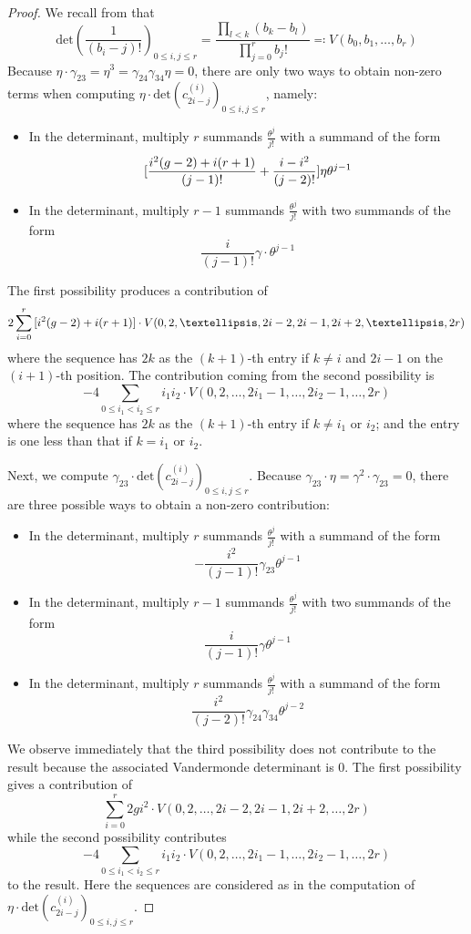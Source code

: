\documentclass{article}
\theoremstyle{plain}
\theoremstyle{definition}
\begin{document}
\begin{proof}
We recall from \cite{FarkasCastel} that  \[\mathrm{det}(\frac{1}{(b_i-j)!})_{0\leq i, j\leq r} = \frac{\prod_{l<k}(b_k-b_l)}{\prod_{j=0}^{r}b_j!}\eqqcolon V(b_0,b_1,\ldots, b_r)\]
Because $\eta\cdot \gamma_{23} = \eta^3 = \gamma_{24}\gamma_{34}\eta = 0$, there are only two ways to obtain non-zero terms when computing $\eta \cdot \mathrm{det}(c^{(i)}_{2i-j})_{0\leq i,j\leq r}$, namely: 
\begin{itemize}
	\item In the determinant, multiply $r$ summands $\frac{\theta^j}{j!}$ with a summand of the form 
	\[ \text{\LARGE [} \frac{i^2(g-2) + i(r+1)}{(j-1)!} + \frac{i-i^2}{(j-2)!} \text{\LARGE ]}\eta\theta^{j-1} \]
	\item  In the determinant, multiply $r-1$ summands $\frac{\theta^j}{j!}$ with two summands of the form 
	\[ \frac{i}{(j-1)!}\gamma\cdot \theta^{j-1} \] 
\end{itemize}  
The first possibility produces a contribution of 
\[ 2\sum_{i=0}^r\text{\Large [}i^2(g-2) +i(r+1) \text{\Large ]}\cdot V(0,2,\ldots, 2i-2, 2i-1, 2i+2,\ldots, 2r) \]
where the sequence has $2k$ as the $(k+1)$-th entry if $k\neq i$ and $2i-1$ on the $(i+1)$-th position. The contribution coming from the second possibility is 
\[ - 4\sum_{0\leq i_1<i_2\leq r}i_1i_2\cdot V(0,2,\ldots, 2i_1-1, \ldots, 2i_2-1,\ldots, 2r)\]
where the sequence has $2k$ as the $(k+1)$-th entry if $k\neq i_1$ or $i_2$; and the entry is one less than that if $k =i_1$ or $i_2$.

Next, we compute $\gamma_{23}\cdot \mathrm{det}(c^{(i)}_{2i-j})_{0\leq i,j\leq r}$. Because $\gamma_{23}\cdot \eta = \gamma^2\cdot \gamma_{23} = 0$, there are three possible ways to obtain a non-zero contribution: 
\begin{itemize}
	\item In the determinant, multiply $r$ summands $\frac{\theta^j}{j!}$ with a summand of the form  
	\[  - \frac{i^2}{(j-1)!}\gamma_{23}\theta^{j-1}\]
	\item In the determinant, multiply $r-1$ summands $\frac{\theta^j}{j!}$ with two summands of the form
	\[\frac{i}{(j-1)!}\gamma\theta^{j-1}\]
	\item In the determinant, multiply $r$ summands $\frac{\theta^j}{j!}$ with a summand of the form  
	\[  \frac{i^2}{(j-2)!}\gamma_{24}\gamma_{34}\theta^{j-2}\]
\end{itemize}
We observe immediately that the third possibility does not contribute to the result because the associated Vandermonde determinant is 0. The first possibility gives a contribution of 
\[ \sum_{i=0}^r 2gi^2\cdot V(0,2,\ldots, 2i-2, 2i-1, 2i+2,\ldots, 2r) \]
while the second possibility contributes 
\[ - 4\sum_{0\leq i_1<i_2\leq r}i_1i_2\cdot V(0,2,\ldots, 2i_1-1, \ldots, 2i_2-1,\ldots, 2r)\]
to the result. Here the sequences are considered as in the computation of $\eta \cdot \mathrm{det}(c^{(i)}_{2i-j})_{0\leq i,j\leq r}$. 


\end{proof}
\end{document}
